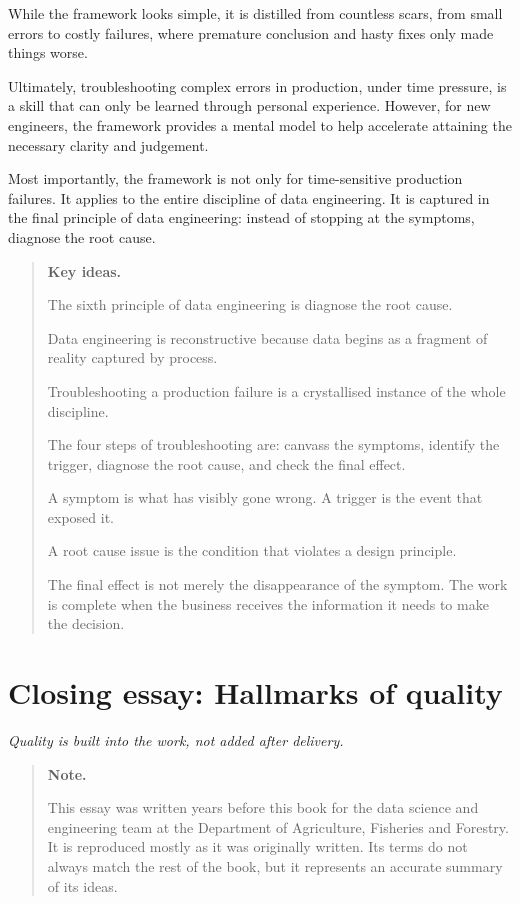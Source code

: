 \documentclass[10pt,openany,10pt]{book}
\begin{document}
While the framework looks simple, it is distilled from countless scars,
from small errors to costly failures, where premature conclusion and
hasty fixes only made things worse.

Ultimately, troubleshooting complex errors in production, under time
pressure, is a skill that can only be learned through personal
experience. However, for new engineers, the framework provides a mental
model to help accelerate attaining the necessary clarity and judgement.

Most importantly, the framework is not only for time-sensitive
production failures. It applies to the entire discipline of data
engineering. It is captured in the final principle of data engineering:
instead of stopping at the symptoms, diagnose the root cause.

\begin{quote}
\textbf{Key ideas.}

The sixth principle of data engineering is diagnose the root cause.

Data engineering is reconstructive because data begins as a fragment of
reality captured by process.

Troubleshooting a production failure is a crystallised instance of the
whole discipline.

The four steps of troubleshooting are: canvass the symptoms, identify
the trigger, diagnose the root cause, and check the final effect.

A symptom is what has visibly gone wrong. A trigger is the event that
exposed it.

A root cause issue is the condition that violates a design principle.

The final effect is not merely the disappearance of the symptom. The
work is complete when the business receives the information it needs to
make the decision.
\end{quote}

\newpage

\chapter{Closing essay: Hallmarks of
quality}\label{docs-judgement-under-ambiguity-closing-essay-hallmarks-of-quality}

\emph{Quality is built into the work, not added after delivery.}

\begin{quote}
\textbf{Note.}

This essay was written years before this book for the data science and
engineering team at the Department of Agriculture, Fisheries and
Forestry. It is reproduced mostly as it was originally written. Its
terms do not always match the rest of the book, but it represents an
accurate summary of its ideas.
\end{quote}
\end{document}
